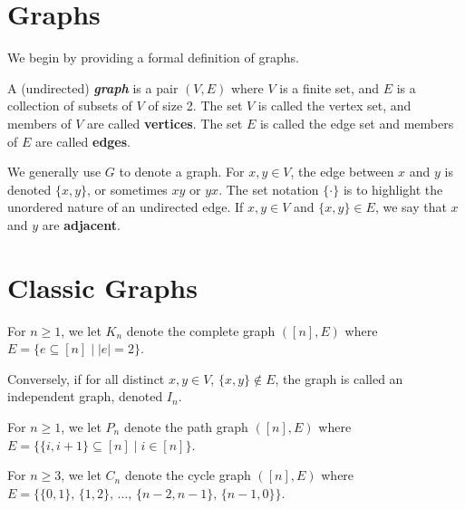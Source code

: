 



\section{Graphs}

We begin by providing a formal definition of graphs.

\begin{definition}
    A (undirected) \textit{\textbf{graph}} is a pair $(V,E)$ where $V$ is a finite set, and $E$ is a collection of subsets of $V$ of size 2. The set $V$ is called the vertex set, and members of $V$ are called \textbf{vertices}. The set $E$ is called the edge set and members of $E$ are called \textbf{edges}.
\end{definition}

We generally use $G$ to denote a graph. For $x,y \in V$, the edge between $x$ and $y$ is denoted $\{x,y\}$, or sometimes $xy$ or $yx$. The set notation $\{\cdot\}$ is to highlight the unordered nature of an undirected edge. If $x, y \in V$ and $\{x,y\} \in E$, we say that $x$ and $y$ are \textbf{adjacent}.

\section{Classic Graphs}

\begin{definition}
    For $n \geq 1$, we let $K_n$ denote the complete graph $([n], E)$ where $E = \{e \subseteq [n] \mid |e| = 2\}$.
\end{definition}

Conversely, if for all distinct $x,y \in V$, $\{x,y\} \not\in E$, the graph is called an independent graph, denoted $I_n$.

\begin{definition}
    For $n \geq 1$, we let $P_n$ denote the path graph $([n], E)$ where $E = \{ \{i,i+1\} \subseteq [n] \mid i \in [n] \}$.
\end{definition}

\begin{definition}
    For $n \geq 3$, we let $C_n$ denote the cycle graph $([n], E)$ where $E = \{ \{0,1\},\, \{1,2\},\, \ldots,\, \{n-2,n-1\},\, \{n-1,0\} \}$.
\end{definition}

